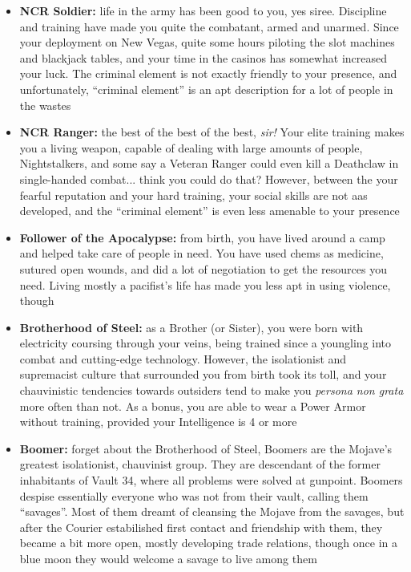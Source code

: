 \documentclass[11pt]{article} %
\begin{document}
\begin{itemize}
	\item \textbf{NCR Soldier:} life in the army has been good to you, yes siree. Discipline and training have made you quite the combatant, armed and unarmed. Since your deployment on New Vegas, quite some hours piloting the slot machines and blackjack tables, and your time in the casinos has somewhat increased your luck. The criminal element is not exactly friendly to your presence, and unfortunately, ``criminal element'' is an apt description for a lot of people in the wastes
	
	\item \textbf{NCR Ranger:} the best of the best of the best, \textit{sir!} Your elite training makes you a living weapon, capable of dealing with large amounts of people, Nightstalkers, and some say a Veteran Ranger could even kill a Deathclaw in single-handed combat... think you could do that? However, between the your fearful reputation and your hard training, your social skills are not aas developed, and the ``criminal element'' is even less amenable to your presence
	
	\item \textbf{Follower of the Apocalypse:} from birth, you have lived around a camp and helped take care of people in need. You have used chems as medicine, sutured open wounds, and did a lot of negotiation to get the resources you need. Living mostly a pacifist's life has made you less apt in using violence, though
	
	\item \textbf{Brotherhood of Steel:} as a Brother (or Sister), you were born with electricity coursing through your veins, being trained since a youngling into combat and cutting-edge technology. However, the isolationist and supremacist culture that surrounded you from birth took its toll, and your chauvinistic tendencies towards outsiders tend to make you \textit{persona non grata} more often than not. As a bonus, you are able to wear a Power Armor without training, provided your Intelligence is 4 or more
	
	\item \textbf{Boomer:} forget about the Brotherhood of Steel, Boomers are the Mojave's greatest isolationist, chauvinist group. They are descendant of the former inhabitants of Vault 34, where all problems were solved at gunpoint. Boomers despise essentially everyone who was not from their vault, calling them ``savages''. Most of them dreamt of cleansing the Mojave from the savages, but after the Courier estabilished first contact and friendship with them, they became a bit more open, mostly developing trade relations, though once in a blue moon they would welcome a savage to live among them
\end{itemize}
\end{document}
